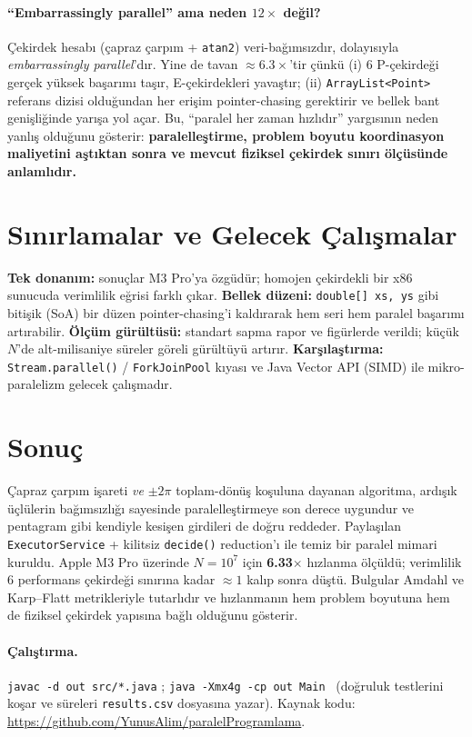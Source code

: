 \documentclass[11pt,a4paper]{article}
\newcommand{\code}[1]{\texttt{\small #1}}
\begin{document}
\paragraph{``Embarrassingly parallel'' ama neden $12\times$ değil?} Çekirdek hesabı (çapraz çarpım
+ \code{atan2}) veri-bağımsızdır, dolayısıyla \emph{embarrassingly parallel}'dır. Yine de tavan
$\approx6.3\times$'tir çünkü (i) 6 P-çekirdeği gerçek yüksek başarımı taşır, E-çekirdekleri
yavaştır; (ii) \code{ArrayList<Point>} referans dizisi olduğundan her erişim pointer-chasing
gerektirir ve bellek bant genişliğinde yarışa yol açar. Bu, ``paralel her zaman hızlıdır''
yargısının neden yanlış olduğunu gösterir: \textbf{paralelleştirme, problem boyutu koordinasyon
maliyetini aştıktan sonra ve mevcut fiziksel çekirdek sınırı ölçüsünde anlamlıdır.}

\section{Sınırlamalar ve Gelecek Çalışmalar}
\textbf{Tek donanım:} sonuçlar M3 Pro'ya özgüdür; homojen çekirdekli bir x86 sunucuda verimlilik
eğrisi farklı çıkar. \textbf{Bellek düzeni:} \code{double[] xs, ys} gibi bitişik (SoA) bir düzen
pointer-chasing'i kaldırarak hem seri hem paralel başarımı artırabilir. \textbf{Ölçüm gürültüsü:}
standart sapma rapor ve figürlerde verildi; küçük $N$'de alt-milisaniye süreler göreli gürültüyü
artırır. \textbf{Karşılaştırma:} \code{Stream.parallel()} / \code{ForkJoinPool} kıyası ve Java
Vector API (SIMD) ile mikro-paralelizm gelecek çalışmadır.

\section{Sonuç}
Çapraz çarpım işareti \emph{ve} $\pm2\pi$ toplam-dönüş koşuluna dayanan algoritma, ardışık
üçlülerin bağımsızlığı sayesinde paralelleştirmeye son derece uygundur ve pentagram gibi
kendiyle kesişen girdileri de doğru reddeder. Paylaşılan \code{ExecutorService} + kilitsiz
\code{decide()} reduction'ı ile temiz bir paralel mimari kuruldu. Apple M3 Pro üzerinde
$N=10^{7}$ için \textbf{6.33$\times$} hızlanma ölçüldü; verimlilik 6 performans çekirdeği sınırına
kadar $\approx1$ kalıp sonra düştü. Bulgular Amdahl ve Karp--Flatt metrikleriyle tutarlıdır ve
hızlanmanın hem problem boyutuna hem de fiziksel çekirdek yapısına bağlı olduğunu gösterir.

\paragraph{Çalıştırma.} \code{javac -d out src/*.java} \quad ; \quad
\code{java -Xmx4g -cp out Main} \ (doğruluk testlerini koşar ve süreleri
\code{results.csv} dosyasına yazar). Kaynak kodu:
\url{https://github.com/YunusAlim/paralelProgramlama}.
\end{document}
